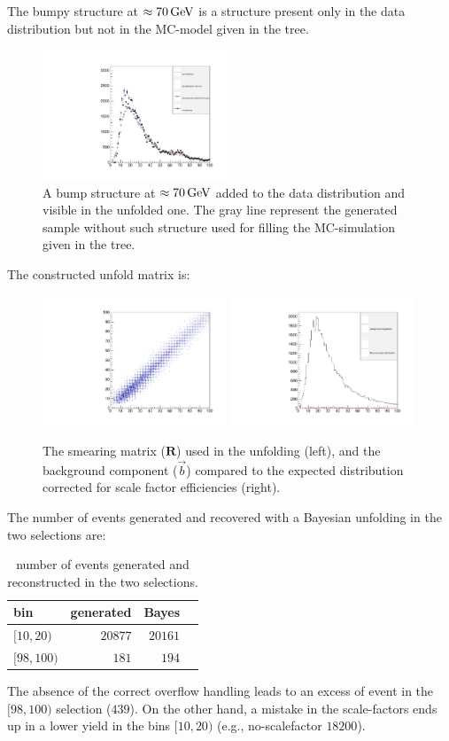 \documentclass[a4paper,11pt]{article}
\begin{document}
The bumpy structure at $\approx70\,\textup{GeV}$ is a structure present only in the data distribution but not in the \gls{MC}-model given in the tree.
\begin{figure}[H]
	\centering
	\includegraphics[width=0.49\textwidth]{figs2/bump.pdf}
	\caption{ \label{fig:sol:bump} A bump structure at $\approx 70\,\textup{GeV}$ added to the data distribution and visible in the unfolded one. The gray line represent the generated sample without such structure used for filling the \gls{MC}-simulation given in the tree.
	}
\end{figure}

The constructed unfold matrix is:
\begin{figure}[H]
	\centering
	\includegraphics[width=0.49\textwidth]{figs2/matrix.pdf}
	\includegraphics[width=0.49\textwidth]{figs2/bkg.pdf}
	\caption{The smearing matrix ($\mathbf{R}$) used in the unfolding (left), and the background component ($\vec{b}$) compared to the expected distribution corrected for scale factor efficiencies (right).
	}
\end{figure}

The number of events generated and recovered with a Bayesian unfolding in the two selections are:
\begin{table}[H]
\centering
\begin{tabular}{lrrr}
	\toprule 
	bin & generated & Bayes \\
	\midrule
	$[10,20)$  & $ 20877 $  & $20161$ \\
	$[98,100)$ &  $ 181 $  & $ 194 $ \\
	\bottomrule
\end{tabular}
\caption{number of events generated and reconstructed in the two selections.}
\end{table}

The absence of the correct overflow handling leads to an excess of event in the $[98,100)$ selection ($439$).
	On the other hand, a  mistake in the scale-factors ends up in a lower yield in the bins $[10,20)$ (e.g., no-scalefactor $18200$).
\end{document}
